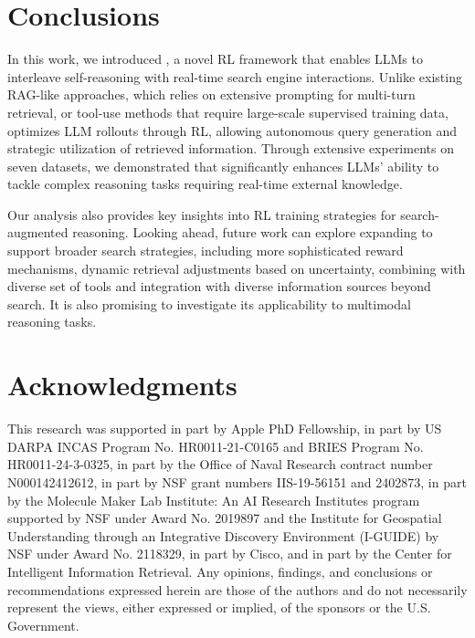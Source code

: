 \section{Conclusions}
In this work, we introduced \Ours, a novel RL framework that enables LLMs to interleave self-reasoning with real-time search engine interactions. 
Unlike existing RAG-like approaches, which relies on extensive prompting for multi-turn retrieval, or tool-use methods that require large-scale supervised training data, \Ours optimizes LLM rollouts through RL, allowing autonomous query generation and strategic utilization of retrieved information.
Through extensive experiments on seven datasets, we demonstrated that \Ours significantly enhances LLMs' ability to tackle complex reasoning tasks requiring real-time external knowledge. 

Our analysis also provides key insights into RL training strategies for search-augmented reasoning.
Looking ahead, future work can explore expanding \Ours to support broader search strategies, including more sophisticated reward mechanisms, dynamic retrieval adjustments based on uncertainty, combining with diverse set of tools and integration with diverse information sources beyond search. 
It is also promising to investigate its applicability to multimodal reasoning tasks.

\section*{Acknowledgments}
This research was supported in part by Apple PhD Fellowship, in part by US DARPA INCAS Program No. HR0011-21-C0165 and BRIES Program No. HR0011-24-3-0325, in part by the Office of Naval Research contract number N000142412612, in part by NSF grant numbers IIS-19-56151 and 2402873, in part by the Molecule Maker Lab Institute: An AI Research Institutes program supported by NSF under Award No. 2019897 and the Institute for Geospatial Understanding through an Integrative Discovery Environment (I-GUIDE) by NSF under Award No. 2118329, in part by Cisco, and in part by the Center for Intelligent Information Retrieval. Any opinions, findings, and conclusions or recommendations expressed herein are those of the authors and do not necessarily represent the views, either expressed or implied, of the sponsors or the U.S. Government.




\appendix
\newpage

